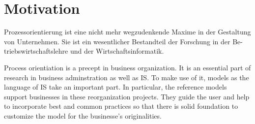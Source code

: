 
\chapter{Motivation}

Prozessorientierung ist eine nicht mehr wegzudenkende Maxime in der Gestaltung von Unternehmen. Sie ist ein wesentlicher Bestandteil der Forschung in der Be- triebswirtschaftslehre und der Wirtschaftsinformatik.

Process orientiation is a precept in business organization. It is an essential part of research in business adminstration as well as \acrfull{IS}. To make use of it, models as the language of \acrshort{IS} take an important part. In particular, the reference models support businesses in these reorganization projects. They guide the user and help to incorporate best and common practices so that there is solid foundation to customize the model for the businesse's originalities.  

